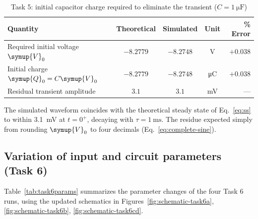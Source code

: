 \documentclass[12pt,a4paper]{article}
\newcommand{\reporttablestyle}{%
	\small
	\renewcommand{\arraystretch}{1.25}%
	\setlength{\tabcolsep}{6pt}%
	\setlength{\arrayrulewidth}{0.4pt}%
	\arrayrulecolor{black!65}}
\begin{document}
	\begin{table}[H]
		\centering
		\caption{Task 5: initial capacitor charge required to eliminate the
			transient ($C = \SI{1}{\micro\farad}$)}
		\label{tab:task5}
		\reporttablestyle
		\begin{tabularx}{\linewidth}{|Y|c|c|c|r|}
			\hline
			\textbf{Quantity} & \textbf{Theoretical} & \textbf{Simulated} & \textbf{Unit} & \textbf{\% Error} \\ \hline
			
			Required initial voltage $\symup{V}_{0}$ & $-8.2779$ & $-8.2748$ & \si{\volt}
			& $+0.038$ \\ \hline
			Initial charge $\symup{Q}_{0} = C \symup{V}_{0}$ & $-8.2779$ & $-8.2748$ &
			\si{\micro\coulomb} & $+0.038$ \\ \hline
			Residual transient amplitude & $3.1$ & $3.1$ & \si{\milli\volt} & --- \\ \hline
			
		\end{tabularx}
	\end{table}
	
	The simulated waveform coincides with the theoretical steady state
	of Eq.~\eqref{eq:ss} to within \SI{3.1}{\milli\volt} at $t = 0^{+}$,
	decaying with $\tau = \SI{1}{\milli\second}$. The residue expected
	simply from rounding $\symup{V}_{0}$ to four decimals (Eq.~\eqref{eq:complete-sine}).
	
	\subsection{Variation of input and circuit parameters (Task 6)}
	
	Table~\ref{tab:task6params} summarizes the parameter changes of the
	four Task 6 runs, using the updated schematics in
	Figures~\ref{fig:schematic-task6a}, \ref{fig:schematic-task6b},
	\ref{fig:schematic-task6cd}.
	
\end{document}
